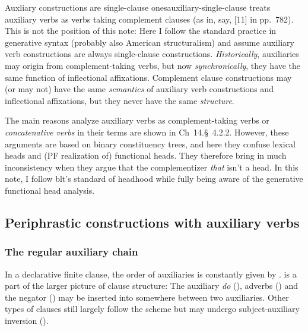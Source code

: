 \documentclass[UTF8, a4paper, oneside, scheme=plain]{ctexrep}
\newcommand*{\citesec}[1]{\S~{#1}}
\newcommand*{\citechap}[1]{Ch~{#1}}
\newcommand*{\citepage}[1]{pp.~{#1}}
\newcommand*{\citechapsec}[2]{\citechap{#1}.\citesec{#2}}
\newcommand*{\term}[1]{\emph{#1}}
\newcommand{\corpus}[1]{\emph{#1}}
\begin{document}
\begin{theorybox}{Auxliary constructions are single-clause ones}{auxiliary-single-clause}
    \citet{cgel} treats auxiliary verbs as verbs taking complement clauses 
    (as in, say, [11] in \citepage{782}).
    This is not the position of this note:
    Here I follow the standard practice in generative syntax (probably also American structuralism) 
    and assume auxiliary verb constructions are always single-clause constructions.
    \emph{Historically}, auxiliaries may origin from complement-taking verbs,
    but now \emph{synchronically}, they have the same function of inflectional affixations.
    Complement clause constructions may (or may not) have the same \emph{semantics} of 
    auxiliary verb constructions and inflectional affixations,
    but they never have the same \emph{structure}.

    The main reasons \citet{cgel} analyze auxiliary verbs as complement-taking verbs or
    \term{concatenative verbs} in their terms 
    are shown in \citechapsec{14}{4.2.2}.
    However, these arguments are based on binary constituency trees,
    and here they confuse lexical heads and (PF realization of) functional heads.
    They therefore bring in much inconsistency when they argue that 
    the complementizer \corpus{that} isn't a head.
    In this note, I follow \acs{blt}'s standard of headhood
    while fully being aware of the generative functional head analysis.
\end{theorybox}

\subsection{Periphrastic constructions with auxiliary verbs}\label{sec:auxiliaries}

\subsubsection{The regular auxiliary chain}\label{sec:auxiliary-chain}

In a declarative finite clause,  
the order of auxiliaries is constantly given by .
 is a part of the larger picture of clause structure:
The auxiliary \corpus{do} (), 
adverbs ()
and the negator ()
may be inserted into somewhere between two auxiliaries.
Other types of clauses still largely follow the scheme but 
may undergo subject-auxiliary inversion ().
\end{document}
